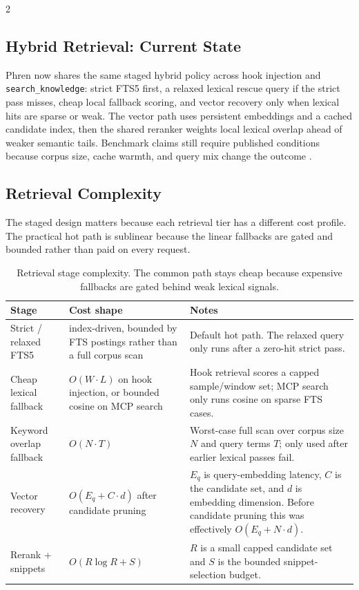 \documentclass[10pt]{article}
\begin{document}
\begin{multicols}{2}
\subsection{Hybrid Retrieval: Current State}
\label{sec:hybrid}

Phren now shares the same staged hybrid policy across hook injection and \texttt{search\_knowledge}: strict FTS5 first, a relaxed lexical rescue query if the strict pass misses, cheap local fallback scoring, and vector recovery only when lexical hits are sparse or weak. The vector path uses persistent embeddings and a cached candidate index, then the shared reranker weights local lexical overlap ahead of weaker semantic tails. Benchmark claims still require published conditions because corpus size, cache warmth, and query mix change the outcome \cite{phren-bench}.

\subsection{Retrieval Complexity}

The staged design matters because each retrieval tier has a different cost profile. The practical hot path is sublinear because the linear fallbacks are gated and bounded rather than paid on every request.

\begin{table}[htbp]
\centering
\begin{tabularx}{\columnwidth}{>{\raggedright\arraybackslash}p{2.2cm} >{\raggedright\arraybackslash}p{2.4cm} >{\raggedright\arraybackslash}X}
\toprule
Stage & Cost shape & Notes \\
\midrule
Strict / relaxed FTS5 & index-driven, bounded by FTS postings rather than a full corpus scan & Default hot path. The relaxed query only runs after a zero-hit strict pass. \\
Cheap lexical fallback & $O(W \cdot L)$ on hook injection, or bounded cosine on MCP search & Hook retrieval scores a capped sample/window set; MCP search only runs cosine on sparse FTS cases. \\
Keyword overlap fallback & $O(N \cdot T)$ & Worst-case full scan over corpus size $N$ and query terms $T$; only used after earlier lexical passes fail. \\
Vector recovery & $O(E_q + C \cdot d)$ after candidate pruning & $E_q$ is query-embedding latency, $C$ is the candidate set, and $d$ is embedding dimension. Before candidate pruning this was effectively $O(E_q + N \cdot d)$. \\
Rerank + snippets & $O(R \log R + S)$ & $R$ is a small capped candidate set and $S$ is the bounded snippet-selection budget. \\
\bottomrule
\end{tabularx}
\caption{Retrieval stage complexity. The common path stays cheap because expensive fallbacks are gated behind weak lexical signals.}
\end{table}


\end{multicols}
\end{document}
